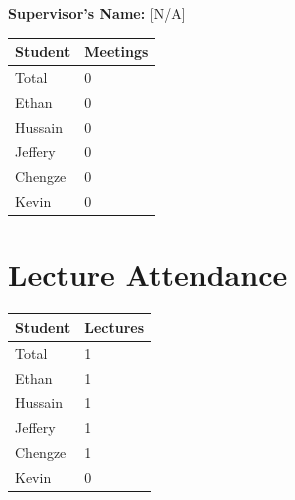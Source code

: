 \documentclass{article}
\begin{document}

\noindent \textbf{Supervisor's Name: } [N/A]

\begin{table}[H]
\centering
\begin{tabular}{ll}
\toprule
\textbf{Student} & \textbf{Meetings}\\
\midrule
Total & 0\\
Ethan & 0\\
Hussain & 0\\
Jeffery & 0\\
Chengze & 0\\
Kevin & 0\\
\bottomrule
\end{tabular}
\end{table}


\section{Lecture Attendance}



\begin{table}[H]
\centering
\begin{tabular}{ll}
\toprule
\textbf{Student} & \textbf{Lectures}\\
\midrule
Total & 1\\
Ethan & 1\\
Hussain & 1\\
Jeffery & 1\\
Chengze & 1\\
Kevin & 0\\
\bottomrule
\end{tabular}
\end{table}
\end{document}
